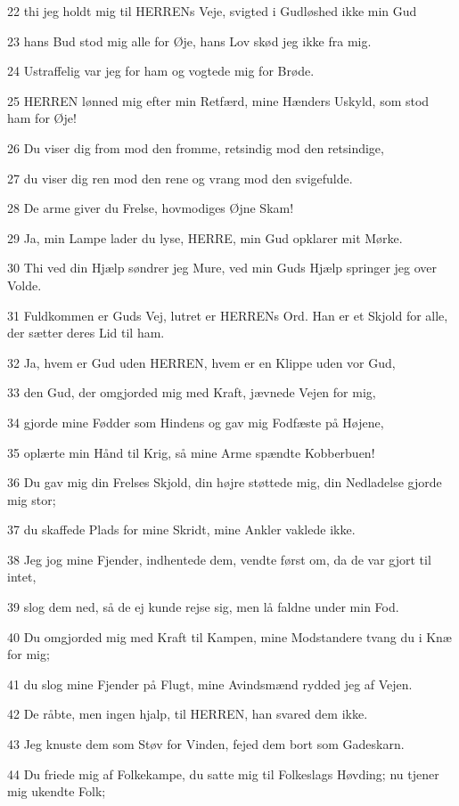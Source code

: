 \par 22 thi jeg holdt mig til HERRENs Veje, svigted i Gudløshed ikke min Gud
\par 23 hans Bud stod mig alle for Øje, hans Lov skød jeg ikke fra mig.
\par 24 Ustraffelig var jeg for ham og vogtede mig for Brøde.
\par 25 HERREN lønned mig efter min Retfærd, mine Hænders Uskyld, som stod ham for Øje!
\par 26 Du viser dig from mod den fromme, retsindig mod den retsindige,
\par 27 du viser dig ren mod den rene og vrang mod den svigefulde.
\par 28 De arme giver du Frelse, hovmodiges Øjne Skam!
\par 29 Ja, min Lampe lader du lyse, HERRE, min Gud opklarer mit Mørke.
\par 30 Thi ved din Hjælp søndrer jeg Mure, ved min Guds Hjælp springer jeg over Volde.
\par 31 Fuldkommen er Guds Vej, lutret er HERRENs Ord. Han er et Skjold for alle, der sætter deres Lid til ham.
\par 32 Ja, hvem er Gud uden HERREN, hvem er en Klippe uden vor Gud,
\par 33 den Gud, der omgjorded mig med Kraft, jævnede Vejen for mig,
\par 34 gjorde mine Fødder som Hindens og gav mig Fodfæste på Højene,
\par 35 oplærte min Hånd til Krig, så mine Arme spændte Kobberbuen!
\par 36 Du gav mig din Frelses Skjold, din højre støttede mig, din Nedladelse gjorde mig stor;
\par 37 du skaffede Plads for mine Skridt, mine Ankler vaklede ikke.
\par 38 Jeg jog mine Fjender, indhentede dem, vendte først om, da de var gjort til intet,
\par 39 slog dem ned, så de ej kunde rejse sig, men lå faldne under min Fod.
\par 40 Du omgjorded mig med Kraft til Kampen, mine Modstandere tvang du i Knæ for mig;
\par 41 du slog mine Fjender på Flugt, mine Avindsmænd rydded jeg af Vejen.
\par 42 De råbte, men ingen hjalp, til HERREN, han svared dem ikke.
\par 43 Jeg knuste dem som Støv for Vinden, fejed dem bort som Gadeskarn.
\par 44 Du friede mig af Folkekampe, du satte mig til Folkeslags Høvding; nu tjener mig ukendte Folk;
